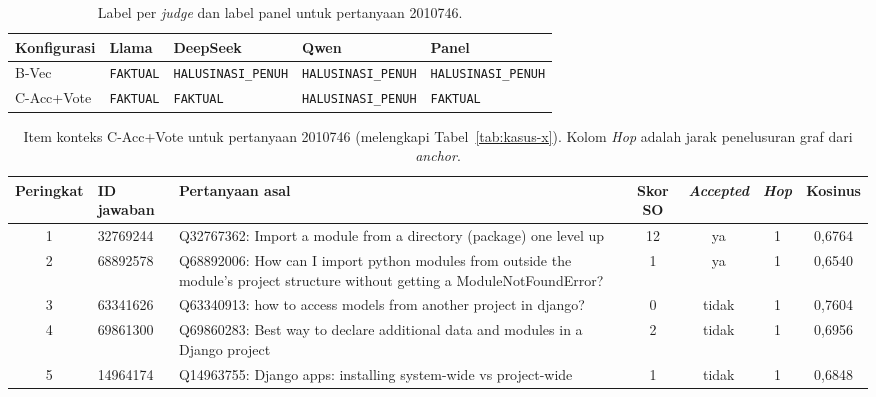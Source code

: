 \begin{table}[!htbp]
\centering
\scriptsize
\caption{Label per \emph{judge} dan label panel untuk pertanyaan 2010746.}
\label{tab:lamp-x-judge}
\renewcommand{\arraystretch}{1.3}
\begin{tabularx}{\textwidth}{|l|*{4}{>{\centering\arraybackslash}X|}}
\hline
\textbf{Konfigurasi} & \textbf{Llama} & \textbf{DeepSeek} & \textbf{Qwen} & \textbf{Panel} \\
\hline
B-Vec & \texttt{FAKTUAL} & \texttt{HALUSINASI\_\allowbreak{}PENUH} & \texttt{HALUSINASI\_\allowbreak{}PENUH} & \texttt{HALUSINASI\_\allowbreak{}PENUH} \\
\hline
C-Acc+Vote & \texttt{FAKTUAL} & \texttt{FAKTUAL} & \texttt{HALUSINASI\_\allowbreak{}PENUH} & \texttt{FAKTUAL} \\
\hline
\end{tabularx}
\end{table}

\begin{table}[!htbp]
\centering
\scriptsize
\caption{Item konteks C-Acc+Vote untuk pertanyaan 2010746 (melengkapi Tabel~\ref{tab:kasus-x}). Kolom \emph{Hop} adalah jarak penelusuran graf dari \emph{anchor}.}
\label{tab:lamp-x-konteks}
\renewcommand{\arraystretch}{1.25}
\begin{tabularx}{\textwidth}{|c|l|>{\raggedright\arraybackslash}X|c|c|c|c|}
\hline
\textbf{Peringkat} & \textbf{ID jawaban} & \textbf{Pertanyaan asal} & \textbf{Skor SO} & \textbf{\emph{Accepted}} & \textbf{\emph{Hop}} & \textbf{Kosinus} \\
\hline
1 & 32769244 & Q32767362: Import a module from a directory (package) one level up & 12 & ya & 1 & 0,6764 \\
\hline
2 & 68892578 & Q68892006: How can I import python modules from outside the module's project structure without getting a ModuleNotFoundError? & 1 & ya & 1 & 0,6540 \\
\hline
3 & 63341626 & Q63340913: how to access models from another project in django? & 0 & tidak & 1 & 0,7604 \\
\hline
4 & 69861300 & Q69860283: Best way to declare additional data and modules in a Django project & 2 & tidak & 1 & 0,6956 \\
\hline
5 & 14964174 & Q14963755: Django apps: installing system-wide vs project-wide & 1 & tidak & 1 & 0,6848 \\
\hline
\end{tabularx}
\end{table}
